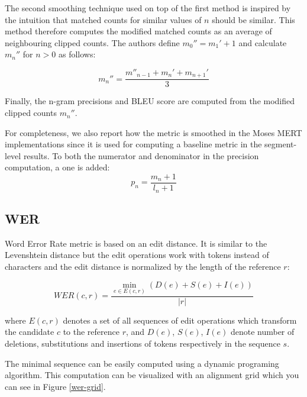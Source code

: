 The second smoothing technique used on top of the first method is inspired by
the intuition that matched counts for similar values of $n$ should be similar.
This method therefore computes the modified matched counts as an average of
neighbouring clipped counts. The authors define $m_0'' = m_1' + 1$ and
calculate $m_n''$ for $n > 0$ as follows:

\begin{equation*}
    m_n'' = \frac{
        m''_{n-1} + m_n' + m_{n+1}'
    }{
        3
    }
\end{equation*}

Finally, the n-gram precisions and BLEU score are computed from the modified
clipped counts $m_n''$.

For completeness, we also report how the  metric is smoothed in
the Moses MERT implementations since it is used for computing a baseline metric
 in the segment-level results. To both the numerator and denominator
in the precision computation, a one is added:
\begin{equation*}
    p_n = \frac{
        m_n + 1
    }{
        l_n + 1
    }
\end{equation*}

\subsection{WER}

Word Error Rate metric is based on an edit distance. It is similar to the Levenshtein
distance but the edit operations work with tokens instead of characters and the edit
distance is normalized by the length of the reference $r$:

\begin{equation*}
    WER(c,r) = \frac{
        \min_{e \in E(c,r)} \left( D(e) + S(e) + I(e) \right)
    }{
        |r|
    }
\end{equation*}

\noindent where $E(c,r)$ denotes a set of all sequences of edit operations
which transform the candidate $c$ to the reference $r$, and $D(e)$, $S(e)$,
$I(e)$ denote number of deletions, substitutions and insertions of tokens
respectively in the sequence $s$.

The minimal sequence can be easily computed using a dynamic programing algorithm.
This computation can be visualized with an alignment grid which you can see
in Figure \ref{wer-grid}.

